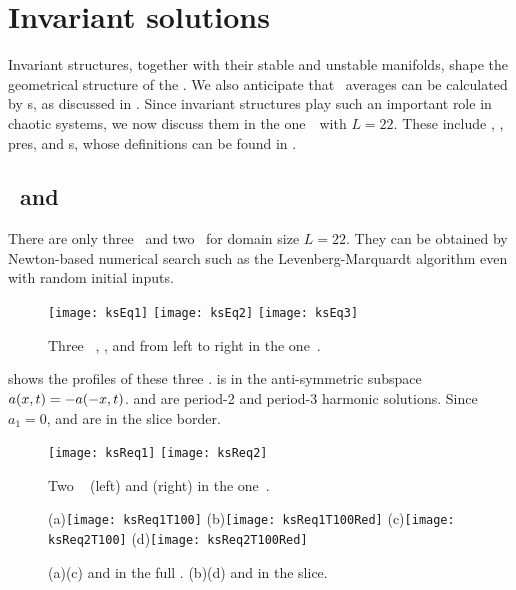 \section{Invariant solutions}

Invariant structures, together with their stable and unstable
manifolds, shape the geometrical structure of the
\statesp. We also anticipate that \spt\ averages can be
calculated by \po s, as discussed in .
Since invariant structures play such an important role in chaotic systems,
we now discuss them in the one\dmn\
\KSe\ with $L=22$. These include \eqva, \reqva, pre\po s, and
\rpo s, whose definitions can be found in .

\subsection{\Eqva\ and \reqva}

There are only three \eqva\ and two \reqva\ for domain size $L = 22$.
They can be obtained by Newton-based numerical search such as
the Levenberg-Marquardt algorithm
even with random initial inputs.

\begin{figure}[h]
  \centering
  \texttt{[image: ksEq1]}
  \texttt{[image: ksEq2]}
  \texttt{[image: ksEq3]}
  \caption[Three \eqva\ in the one\dmn\ \KSe.]
  {
    Three \eqva\ , , and  from left to right in the one\dmn\ \KSe.
  }
  \label{fig:kseq}
\end{figure}

 shows the profiles of these three \eqva.  is in
the anti-symmetric subspace $a(x, t) = -a(-x, t)$.  and
 are period-2 and period-3 harmonic solutions. Since $a_1 = 0$,
\EQV{2} and \EQV{3} are in the slice border.

\begin{figure}[h]
  \centering
  \texttt{[image: ksReq1]}
  \texttt{[image: ksReq2]}
  \caption[Two \Reqva\ in the one\dmn\ \KSe.]
  {
    Two \reqva\  (left) and 
    (right) in the one\dmn\ \KSe.
  }
  \label{fig:ksreq}
\end{figure}

\begin{figure}[h]
  \centering
  (a)\texttt{[image: ksReq1T100]}
  (b)\texttt{[image: ksReq1T100Red]}
  (c)\texttt{[image: ksReq2T100]}
  (d)\texttt{[image: ksReq2T100Red]}
  \caption[\Reqva\ in the full \statesp\ and in the slice in the one\dmn\ \KSe.]
  {
    (a)(c)  and  in the full \statesp.
    (b)(d) \REQV{1}{} and \REQV{2}{} in the slice.
  }
  \label{fig:ksreqT100}
\end{figure}

